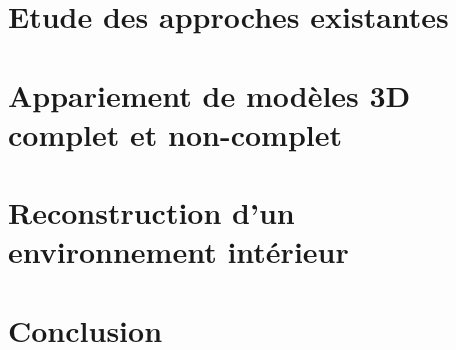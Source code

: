 \documentclass[a4paper,11pt]{article}
\begin{document}
\section{Etude des approches existantes}


\section{Appariement de modèles 3D complet et non-complet}


\section{Reconstruction d'un environnement intérieur}



\section{Conclusion}




\end{document}
